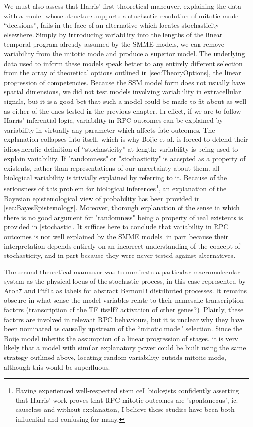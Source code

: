 We must also assess that Harris' first theoretical maneuver, explaining the data with a model whose structure supports a stochastic resolution of mitotic mode ``decisions'', fails in the face of an alternative which locates stochasticity elsewhere. Simply by introducing variability into the lengths of the linear temporal program already assumed by the SMME models, we can remove variability from the mitotic mode and produce a superior model. The underlying data used to inform these models speak better to any entirely different selection from the array of theoretical options outlined in \autoref{sec:TheoryOptions}, the linear progression of competencies. Because the SSM model form does not usually have spatial dimensions, we did not test models involving variablility in extracellular signals, but it is a good bet that such a model could be made to fit about as well as either of the ones tested in the previous chapter. In effect, if we are to follow Harris' inferential logic, variability in RPC outcomes can be explained by variability in virtually any parameter which affects fate outcomes. The explanation collapses into itself, which is why Boije et al. is forced to defend their idiosyncratic definition of ``stochasticity'' at length: variability is being used to explain variability. If "randomness" or "stochasticity" is accepted as a property of existents, rather than representations of our uncertainty about them, all biological variability is trivially explained by referring to it. Because of the seriousness of this problem for biological inferences\footnote{Having experienced well-respected stem cell biologists confidently asserting that Harris' work proves that RPC mitotic outcomes are 'spontaneous', ie. causeless and without explanation, I believe these studies have been both influential and confusing for many.}, an explanation of the Bayesian epistemological view of probability has been provided in \autoref{sec:BayesEpistemology}. Moreover, thorough explanation of the sense in which there is no good argument for "randomness" being a property of real existents is provided in \autoref{stochastic}. It suffices here to conclude that variability in RPC outcomes is not well explained by the SMME models, in part because their interpretation depends entirely on an incorrect understanding of the concept of stochasticity, and in part because they were never tested against alternatives.

The second theoretical maneuver was to nominate a particular macromolecular system as the physical locus of the stochastic process, in this case represented by Atoh7 and Ptf1a as labels for abstract Bernoulli distributed processes. It remains obscure in what sense the model variables relate to their namesake transcription factors (transcription of the TF itself? activation of other genes?). Plainly, these factors are involved in relevant RPC behaviours, but it is unclear why they have been nominated as causally upstream of the ``mitotic mode'' selection. Since the Boije model inherits the assumption of a linear progression of stages, it is very likely that a model with similar explanatory power could be built using the same strategy outlined above, locating random variability outside mitotic mode, although this would be superfluous.

